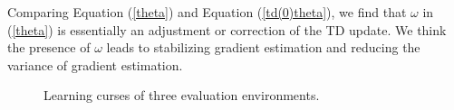 Comparing Equation (\ref{theta}) and Equation (\ref{td(0)theta}), we find that $\omega$ in 
(\ref{theta}) is essentially an adjustment or correction of the TD update. We think 
the presence  of $\omega$ leads to stabilizing gradient estimation and reducing the variance
of gradient estimation.
\begin{figure}[H]
    \vskip 0.2in
    \begin{center}
        \caption{Learning curses of three evaluation environments.}
        \label{learningcurvesofbairdexample}
    \end{center}
    \vskip -0.2in
\end{figure}

